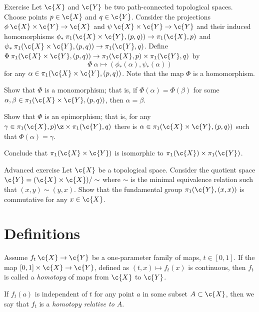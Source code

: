 \begin{thm}{Exercise}
Let $\c{X}$ and $\c{Y}$ be two path-connected topological spaces.
Choose points $p\in \c{X}$ and $q\in \c{Y}$.
Consider the projections $\phi\:\c{X}\times\c{Y}\to \c{X}$ and $\psi\:\c{X}\times\c{Y}\to \c{Y}$
and their induced homomorphisms
$\phi_*\:\pi_1(\c{X}\times\c{Y},(p,q))\to \pi_1(\c{X},p)$
and $\psi_*\:\pi_1(\c{X}\times\c{Y},(p,q))\to \pi_1(\c{Y},q)$.
Define $\Phi\:\pi_1(\c{X}\times\c{Y},(p,q))\to \pi_1(\c{X},p)\times \pi_1(\c{Y},q)$ by
\[\Phi\:\alpha\mapsto (\phi_*(\alpha),\psi_*(\alpha))\]
for any $\alpha\in \pi_1(\c{X}\times\c{Y},(p,q))$.
Note that the map $\Phi$ is a homomorphism.

\begin{subthm}{}
Show that $\Phi$ is a monomorphism;
that is, if $\Phi(\alpha)=\Phi(\beta)$ for some $\alpha,\beta\in \pi_1(\c{X}\times\c{Y},(p,q))$, then 
$\alpha=\beta$.
\end{subthm}

\begin{subthm}{}
Show that $\Phi$ is an epimorphism;
that is, for any $\gamma\in \pi_1(\c{X},p)\z\times\pi_1(\c{Y},q)$ there is $\alpha\in\pi_1(\c{X}\times\c{Y},(p,q))$ such that $\Phi(\alpha)=\gamma$.
\end{subthm}

Conclude that $\pi_1(\c{X}\times\c{Y})$ is isomorphic to $\pi_1(\c{X})\times\pi_1(\c{Y})$.
\end{thm}

\begin{thm}{Advanced exercise}
Let $\c{X}$ be a topological space.
Consider the quotient space $\c{Y}=(\c{X}\times \c{X})/\sim$ where $\sim$ is the minimal equivalence relation such that $(x,y)\sim (y,x)$.
Show that the fundamental group $\pi_1(\c{Y},(x,x))$ is commutative for any $x\in \c{X}$.
\end{thm}


\section{Definitions}

Assume $f_t\:\c{X}\to \c{Y}$ be a one-parameter family of maps, $t\in [0,1]$.
If the map $[0,1]\times \c{X}\to \c{Y}$, defined as $(t,x)\mapsto f_t(x)$ is continuous, then $f_t$ is called a \emph{homotopy} of maps from $\c{X}$ to $\c{Y}$.

If $f_t(a)$ is independent of $t$ for any point $a$ in some subset $A\subset \c{X}$, then we say that  $f_t$ is a {}\emph{homotopy relative to $A$}. 

